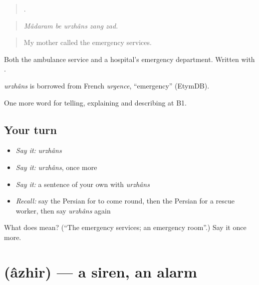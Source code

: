 \begin{quote}
    .
\end{quote}

\begin{quote}
\emph{Mâdaram be urzhâns zang zad.}
\end{quote}

\begin{quote}
My mother called the emergency services.
\end{quote}

Both the ambulance service and a hospital's emergency department. Written with .

\begin{cousinweb}
\emph{urzhâns} is borrowed from French \emph{urgence}, \textquotedblleft{}emergency\textquotedblright{} (EtymDB).
\end{cousinweb}

\begin{grammarlens}[title={What you've built}]
One more word for telling, explaining and describing at B1.
\end{grammarlens}

\subsection*{Your turn}
\begin{itemize}
\raggedright
  \item \emph{Say it:} \emph{urzhâns}
  \item \emph{Say it:} \emph{urzhâns}, once more
  \item \emph{Say it:} a sentence of your own with \emph{urzhâns}
  \item \emph{Recall:} say the Persian for to come round, then the Persian for a rescue worker, then say \emph{urzhâns} again
\end{itemize}

\begin{tcolorbox}[breakable,colback=teal!4,colframe=teal!35!black,title={Before you move on}]
What does  mean? (\textquotedblleft{}The emergency services; an emergency room\textquotedblright{}.) Say it once more.
\end{tcolorbox}
\section[\texorpdfstring{\fa{آژیر} (âzhir)}{آژیر (âzhir)}]{ (âzhir) — a siren, an alarm}


